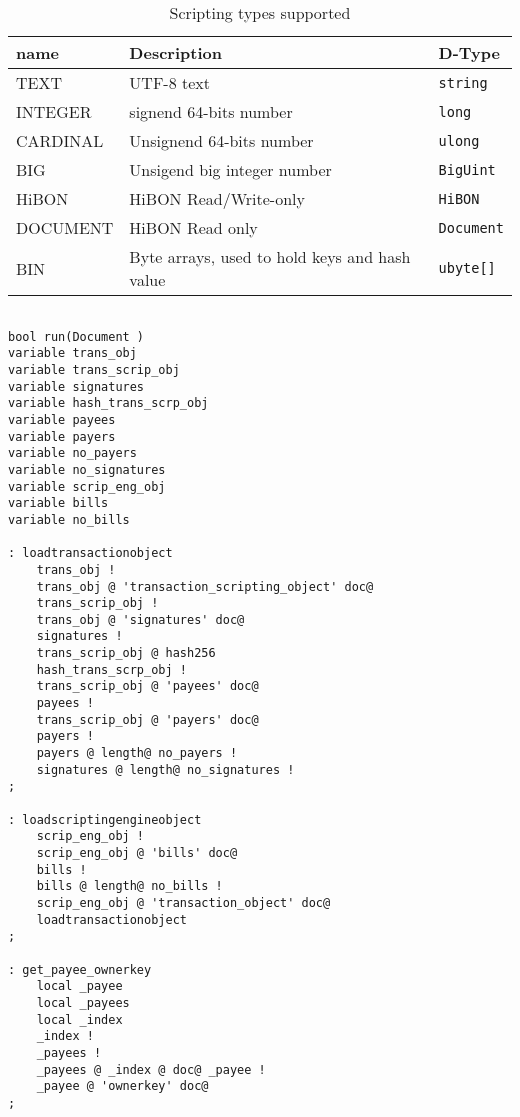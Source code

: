 \begin{table}[H]
\begin{center}
\begin{tabular}{|l|l|l|}
\hline
name & Description & D-Type \\
\hline
TEXT & UTF-8 text & \texttt{string} \\
\hline
INTEGER & signend 64-bits number &  \texttt{long} \\
\hline
CARDINAL & Unsignend 64-bits number & \texttt{ulong} \\
\hline
BIG & Unsigend big integer number & \texttt{BigUint}  \\
\hline
HiBON & HiBON Read/Write-only & \texttt{HiBON} \\
\hline
DOCUMENT & HiBON Read only & \texttt{Document} \\
\hline
BIN & Byte arrays, used to hold keys and hash value & \texttt{ubyte[]} \\
\hline
\end{tabular}
\end{center}
\caption{Scripting types supported}
\label{tab:script_types}
\end{table}


\lstset{language=bash, numbers=left, numberstyle=\tiny, stepnumber=1, numbersep=5pt, tabsize=4}

\begin{lstlisting}

bool run(Document )
variable trans_obj
variable trans_scrip_obj
variable signatures
variable hash_trans_scrp_obj
variable payees
variable payers
variable no_payers
variable no_signatures
variable scrip_eng_obj
variable bills
variable no_bills

: loadtransactionobject
    trans_obj !
    trans_obj @ 'transaction_scripting_object' doc@
    trans_scrip_obj !
    trans_obj @ 'signatures' doc@
    signatures !
    trans_scrip_obj @ hash256
    hash_trans_scrp_obj !
    trans_scrip_obj @ 'payees' doc@
    payees !
    trans_scrip_obj @ 'payers' doc@
    payers !
    payers @ length@ no_payers !
    signatures @ length@ no_signatures !
;

: loadscriptingengineobject
    scrip_eng_obj !
    scrip_eng_obj @ 'bills' doc@
    bills !
    bills @ length@ no_bills !
    scrip_eng_obj @ 'transaction_object' doc@
    loadtransactionobject
;

: get_payee_ownerkey
    local _payee
    local _payees
    local _index
    _index !
    _payees !
    _payees @ _index @ doc@ _payee !
    _payee @ 'ownerkey' doc@
;

\end{lstlisting}
